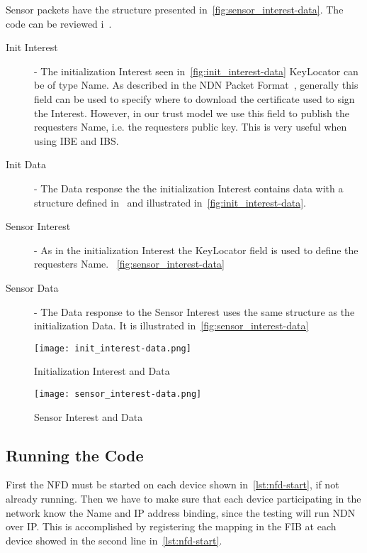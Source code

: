 Sensor packets have the structure presented in~\autoref{fig:sensor_interest-data}.
The code can be reviewed i~\cite[messageBuf.proto]{garseg15}.
\begin{description}
	\item[Init Interest] - 
  The initialization Interest seen in~\autoref{fig:init_interest-data}
  KeyLocator can be of type Name. 
  As described in the \gls{NDN} Packet Format~\cite{ndnpacketformat}, generally this field can be used to specify where to download the certificate used to sign the Interest.
  However, in our trust model we use this field to publish the requesters Name, i.e. the requesters public key. 
  This is very useful when using \gls{IBE} and \gls{IBS}.
	\item[Init Data] - 
  The Data response the the initialization Interest contains data with a structure defined in~\cite[messageBuf.proto]{garseg15} and illustrated in~\autoref{fig:init_interest-data}.
	\item[Sensor Interest] -
	As in the initialization Interest the KeyLocator field is used to define the requesters Name. ~\autoref{fig:sensor_interest-data}
	\item[Sensor Data] - 
  The Data response to the Sensor Interest uses the same structure as the initialization Data. It is illustrated in~\autoref{fig:sensor_interest-data}
\end{description}

\begin{figure}[ht]
  \centering
  \texttt{[image: init\_interest-data.png]}
  \caption{Initialization Interest and Data}
  \label{fig:init_interest-data}
\end{figure}

\begin{figure}[ht]
  \centering
  \texttt{[image: sensor\_interest-data.png]}
  \caption{Sensor Interest and Data}
  \label{fig:sensor_interest-data}
\end{figure}

\subsection{Running the Code}
First the \gls{NFD} must be started on each device shown in~\autoref{lst:nfd-start}, if not already running. 
Then we have to make sure that each device participating in the network know the Name and \gls{IP} address binding, since the testing will run \gls{NDN} over \gls{IP}.
This is accomplished by registering the mapping in the \gls{FIB} at each device showed in the second line in~\autoref{lst:nfd-start}.

